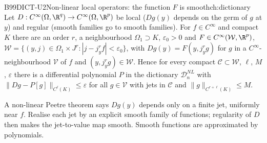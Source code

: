 \begin{dimcard}{B99}{DICT-U2}{Non-linear local operators: the function $F$ is smooth}{\pw}{ch:dictionary}
Let $D:C^\infty(\Omega,\R^q)\to C^\infty(\Omega,\R^p)$ be local ($Dg(y)$ depends on the germ of $g$ at $y$) and regular (smooth families go to smooth families). For $f\in C^\infty$ and compact $K$ there are an order $r$, a neighbourhood $\Omega_1\supset K$, $\varepsilon_0>0$ and $F\in C^\infty(\mathcal W,\R^p)$, $\mathcal W=\{(y,j)\in\Omega_1\times J^r:|j-j^r_yf|<\varepsilon_0\}$, with $Dg(y)=F(y,j^r_yg)$ for $g$ in a $C^\infty$-neighbourhood $\mathcal V$ of $f$ and $(y,j^r_yg)\in\mathcal W$. Hence for every compact $\mathcal C\subset\mathcal W$, $\ell$, $M$, $\varepsilon$ there is a differential polynomial $P$ in the dictionary $\mathcal D^{NL}_n$ with $\|Dg-P[g]\|_{C^\ell(K)}\le\varepsilon$ for all $g\in\mathcal V$ with jets in $\mathcal C$ and $\|g\|_{C^{r+\ell}(K)}\le M$.
\end{dimcard}

\begin{proofidea}
A non-linear Peetre theorem says $Dg(y)$ depends only on a finite jet, uniformly near $f$. Realise each jet by an explicit smooth family of functions; regularity of $D$ then makes the jet-to-value map smooth. Smooth functions are approximated by polynomials.
\end{proofidea}

